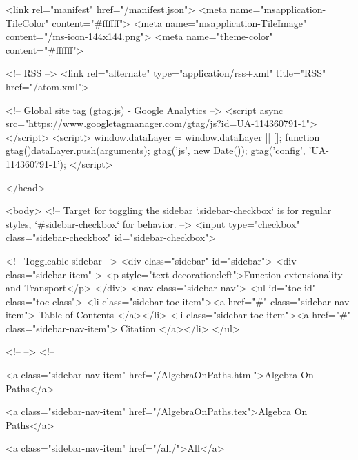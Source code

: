   <link rel="manifest" href="/manifest.json">
  <meta name="msapplication-TileColor" content="#ffffff">
  <meta name="msapplication-TileImage" content="/ms-icon-144x144.png">
  <meta name="theme-color" content="#ffffff">
  
  <!-- RSS -->
  <link rel="alternate" type="application/rss+xml" title="RSS" href="/atom.xml">

  <!-- Global site tag (gtag.js) - Google Analytics -->
  <script async src="https://www.googletagmanager.com/gtag/js?id=UA-114360791-1"></script>
  <script>
    window.dataLayer = window.dataLayer || [];
    function gtag(){dataLayer.push(arguments);}
    gtag('js', new Date());
    gtag('config', 'UA-114360791-1');
  </script>

  
</head>




  <body>
    <!-- Target for toggling the sidebar `.sidebar-checkbox` is for regular
     styles, `#sidebar-checkbox` for behavior. -->
<input type="checkbox" class="sidebar-checkbox" id="sidebar-checkbox">

<!-- Toggleable sidebar -->
<div class="sidebar" id="sidebar">
  <div class="sidebar-item" >
    <p style="text-decoration:left">Function extensionality and Transport</p>
  </div>
  <nav class="sidebar-nav">
    <ul id="toc-id" class="toc-class">
  <li class="sidebar-toc-item"><a href="#" class="sidebar-nav-item"> Table of Contents </a></li>
  <li class="sidebar-toc-item"><a href="#" class="sidebar-nav-item"> Citation </a></li>
</ul>


    <!--  -->
    <!-- 
      
    
      
    
      
    
      
        
      
    
      
        
          <a class="sidebar-nav-item" href="/AlgebraOnPaths.html">Algebra On Paths</a>
        
      
    
      
        
          <a class="sidebar-nav-item" href="/AlgebraOnPaths.tex">Algebra On Paths</a>
        
      
    
      
        
          <a class="sidebar-nav-item" href="/all/">All</a>
        
      
    
      
        
